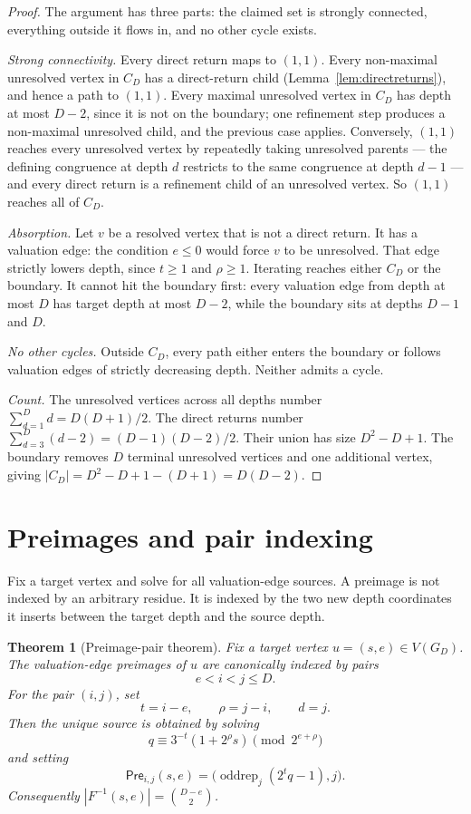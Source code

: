 \documentclass[11pt]{amsart}
\newtheorem{theorem}{Theorem}[section]
\theoremstyle{definition}
\theoremstyle{remark}
\newcommand{\oddrep}{\operatorname{oddrep}}
\newcommand{\Pre}{\mathsf{Pre}}
\begin{document}
\begin{proof}
The argument has three parts: the claimed set is strongly connected,
everything outside it flows in, and no other cycle exists.

\medskip\noindent\emph{Strong connectivity.}
Every direct return maps to $(1,1)$.  Every non-maximal unresolved
vertex in $C_D$ has a direct-return child
(Lemma~\ref{lem:directreturns}), and hence a path to $(1,1)$.  Every
maximal unresolved vertex in $C_D$ has depth at most $D-2$, since it
is not on the boundary; one refinement step produces a non-maximal
unresolved child, and the previous case applies.  Conversely, $(1,1)$
reaches every unresolved vertex by repeatedly taking unresolved parents
--- the defining congruence at depth $d$ restricts to the same
congruence at depth $d-1$ --- and every direct return is a refinement
child of an unresolved vertex.  So $(1,1)$ reaches all of $C_D$.

\medskip\noindent\emph{Absorption.}
Let $v$ be a resolved vertex that is not a direct return.  It has a
valuation edge: the condition $e\le0$ would force $v$ to be unresolved.
That edge strictly lowers depth, since $t\ge1$ and $\rho\ge1$.
Iterating reaches either $C_D$ or the boundary.  It cannot hit the
boundary first: every valuation edge from depth at most $D$ has target
depth at most $D-2$, while the boundary sits at depths $D-1$ and $D$.

\medskip\noindent\emph{No other cycles.}
Outside $C_D$, every path either enters the boundary or follows
valuation edges of strictly decreasing depth.  Neither admits a cycle.

\medskip\noindent\emph{Count.}
The unresolved vertices across all depths number
$\sum_{d=1}^D d = D(D+1)/2$.  The direct returns number
$\sum_{d=3}^D(d-2) = (D-1)(D-2)/2$.  Their union has size $D^2-D+1$.
The boundary removes $D$ terminal unresolved vertices and one
additional vertex, giving $|C_D|=D^2-D+1-(D+1)=D(D-2)$.
\end{proof}

\section{Preimages and pair indexing}\label{sec:preimages}
Fix a target vertex and solve for all valuation-edge sources.  A
preimage is not indexed by an arbitrary residue.  It is indexed by the
two new depth coordinates it inserts between the target depth and the
source depth.

\begin{theorem}[Preimage-pair theorem]\label{thm:preimage}
Fix a target vertex $u=(s,e)\in V(G_D)$.  The valuation-edge preimages
of $u$ are canonically indexed by pairs
\[
e<i<j\le D.
\]
For the pair $(i,j)$, set
\[
t=i-e,
\qquad
\rho=j-i,
\qquad
 d=j.
\]
Then the unique source is obtained by solving
\[
q\equiv3^{-t}(1+2^\rho s)\pmod {2^{e+\rho}}
\]
and setting
\[
\Pre_{i,j}(s,e)=\bigl(\oddrep_j(2^tq-1),j\bigr).
\]
Consequently $|F^{-1}(s,e)|=\binom{D-e}{2}$.
\end{theorem}
\end{document}
